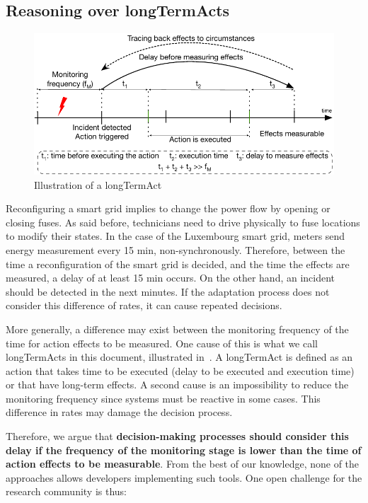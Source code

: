\subsection[Reasoning over long-term actions]{Reasoning over \glspl{longTermAct}}
\label{sec:intro:challenges:longTermAct}

\begin{figure}
	\centering
	\includegraphics[width=0.9\linewidth]{img/chapt-intro/challenges/longTermAct}
	\caption{Illustration of a \gls{longTermAct}}
	\label{fig:intro:chal:longTermAct}
\end{figure}

Reconfiguring a smart grid implies to change the power flow by opening or closing fuses.
As said before, technicians need to drive physically to fuse locations to modify their states.
In the case of the Luxembourg smart grid, meters send energy measurement every 15 min, non-synchronously.
Therefore, between the time a reconfiguration of the smart grid is decided, and the time the effects are measured, a delay of at least 15 min occurs.
On the other hand, an incident should be detected in the next minutes.
If the adaptation process does not consider this difference of rates, it can cause repeated decisions.

More generally, a difference may exist between the monitoring frequency of the time for action effects to be measured.
One cause of this is what we call \glspl{longTermAct} in this document, illustrated in~.
A \gls{longTermAct} is defined as an \gls{action} that takes time to be executed  (delay to be executed and execution time) or that have long-term effects.
A second cause is an impossibility to reduce the monitoring frequency since systems must be reactive in some cases.
This difference in rates may damage the decision process.

Therefore, we argue that \textbf{decision-making processes should consider this delay if the frequency of the monitoring stage is lower than the time of action effects to be measurable}.
From the best of our knowledge, none of the approaches allows developers implementing such tools.
One open challenge for the research community is thus:
\vspace{-2em}


